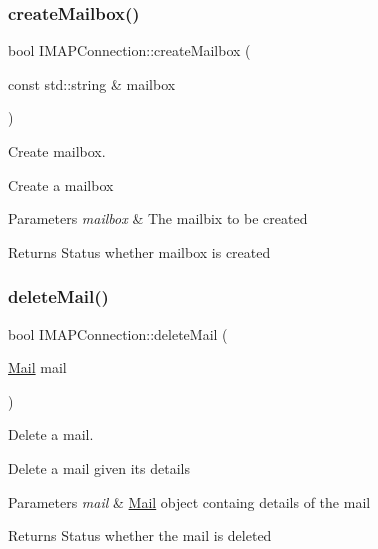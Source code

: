 \subsubsection{\texorpdfstring{create\+Mailbox()}{createMailbox()}}
{\footnotesize\ttfamily bool I\+M\+A\+P\+Connection\+::create\+Mailbox (\begin{DoxyParamCaption}\item[{const std\+::string \&}]{mailbox }\end{DoxyParamCaption})}



Create mailbox. 

Create a mailbox


\begin{DoxyParams}{Parameters}
{\em mailbox} & The mailbix to be created\\
\hline
\end{DoxyParams}
\begin{DoxyReturn}{Returns}
Status whether mailbox is created 
\end{DoxyReturn}
\mbox{\label{classIMAPConnection_aba8f1dc3912b1655dfe5dd2fd76a1d7c}} 
\subsubsection{\texorpdfstring{delete\+Mail()}{deleteMail()}}
{\footnotesize\ttfamily bool I\+M\+A\+P\+Connection\+::delete\+Mail (\begin{DoxyParamCaption}\item[{\hyperlink{structMail}{Mail}}]{mail }\end{DoxyParamCaption})}



Delete a mail. 

Delete a mail given its details


\begin{DoxyParams}{Parameters}
{\em mail} & \hyperlink{structMail}{Mail} object containg details of the mail \\
\hline
\end{DoxyParams}
\begin{DoxyReturn}{Returns}
Status whether the mail is deleted 
\end{DoxyReturn}
\mbox{\label{classIMAPConnection_ad74ab3895b9a999dfd4c4930e6a174e3}} 
